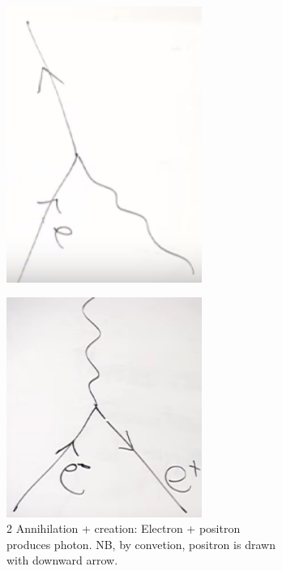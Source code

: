\documentclass[]{article}
\begin{document}
\begin{figure}[H]
\begin{subfigure}{0.48\textwidth}
		\includegraphics[width=0.7\textwidth]{em-dirac2}
	\end{subfigure}
	\begin{subfigure}{0.48\textwidth}
		\caption{2 Annihilation +  creation: Electron + positron produces photon. NB, by convetion, positron is drawn with downward arrow.}
		\includegraphics[width=0.7\textwidth]{em-dirac3}
	\end{subfigure}
	\begin{subfigure}{0.48\textwidth}

\end{subfigure}
\end{figure}
\end{document}
